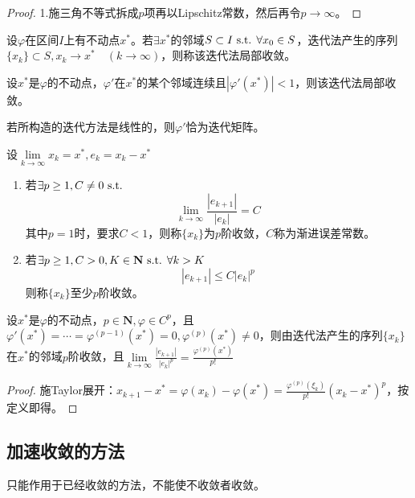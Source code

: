 \documentclass{ctexart}
\begin{document}
\begin{proof}
1.施三角不等式拆成$p$项再以Lipschitz常数，然后再令$p\to \infty$。
\end{proof}

\begin{Def}
设$\varphi$在区间$I$上有不动点$x^*$。若$\exists x^*$的邻域$S\subset I\text{ s.t. }\forall x_0\in S$，迭代法产生的序列$\{x_k\}\subset S,x_k\to x^*\quad(k\to\infty)$，则称该迭代法局部收敛。
\end{Def}

\begin{Thm}
设$x^*$是$\varphi$的不动点，$\varphi'$在$x^*$的某个邻域连续且$|\varphi'(x^*)|<1$，则该迭代法局部收敛。
\end{Thm}

若所构造的迭代方法是线性的，则$\varphi'$恰为迭代矩阵。

\begin{Def}
设$\lim\limits_{k\to\infty}x_k=x^*,e_k=x_k-x^*$
\begin{enumerate}
\item 若$\exists p\geq 1,C\neq 0\text{ s.t. }$
\[\lim_{k\to\infty}\frac{|e_{k+1}|}{|e_k|}=C\]
其中$p=1$时，要求$C<1$，则称$\{x_k\}$为$p$阶收敛，$C$称为渐进误差常数。
\item 若$\exists p\geq 1,C>0,K\in\mathbf{N}\text{ s.t. }\forall k>K$
\[|e_{k+1}|\leq C|e_k|^p\]
则称$\{x_k\}$至少$p$阶收敛。
\end{enumerate}
\end{Def}

\begin{Thm}
设$x^*$是$\varphi$的不动点，$p\in\mathbf{N},\varphi\in C^p$，且$\varphi'(x^*)=\cdots=\varphi^{(p-1)}(x^*)=0,\varphi^{(p)}(x^*)\neq 0$，则由迭代法产生的序列$\{x_k\}$在$x^*$的邻域$p$阶收敛，且$\lim\limits_{k\to\infty}\frac{|e_{k+1}|}{|e_k|^p}=\frac{\varphi^{(p)}(x^*)}{p!}$
\end{Thm}
\begin{proof}
施Taylor展开：$x_{k+1}-x^*=\varphi(x_k)-\varphi(x^*)=\frac{\varphi^{(p)}(\xi_k)}{p!}(x_k-x^*)^p$，按定义即得。
\end{proof}

\subsection{加速收敛的方法}
只能作用于已经收敛的方法，不能使不收敛者收敛。
\end{document}
